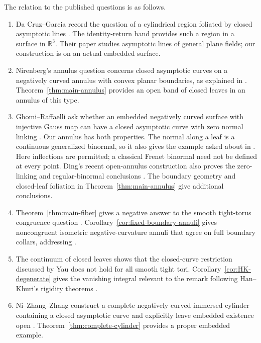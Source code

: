 \documentclass[11pt]{amsart}
\theoremstyle{definition}
\theoremstyle{remark}
\newcommand{\R}{\mathbb R}\newcommand{\Sph}{\mathbb S}
\numberwithin{equation}{section}
\begin{document}
The relation to the published questions is as follows.
\begin{enumerate}[label=\textup{(\roman*)}]
\item Da Cruz--Garcia record the question of a cylindrical region
foliated by closed asymptotic lines \cite[p.~17]{DaCruzGarcia}.
The identity-return band provides such a region in a surface in $\R^3$.
Their paper studies asymptotic lines of general plane fields; our
construction is on an actual embedded surface.
\item Nirenberg's annulus question concerns closed asymptotic curves
on a negatively curved annulus with convex planar boundaries, as
explained in \cite[\S1.2]{GhomiProblems}. Theorem~\ref{thm:main-annulus}
provides an open band of closed leaves in an annulus of this type.
\item Ghomi--Raffaelli ask whether an embedded negatively curved
surface with injective Gauss map can have a closed asymptotic curve
with zero normal linking \cite[Problem~1.1]{GR}. Our annulus has both
properties. The normal along a leaf is a continuous generalized
binormal, so it also gives the example asked about in
\cite[Problem~1.4]{GhomiProblems}. Here inflections are permitted;
a classical Frenet binormal need not be defined at every point.
Ding's recent open-annulus construction also proves the zero-linking
and regular-binormal conclusions \cite[Theorem~1.1 and
Corollary~1.2]{Ding2026}. The boundary geometry and closed-leaf
foliation in Theorem~\ref{thm:main-annulus} give additional conclusions.
\item Theorem~\ref{thm:main-fiber} gives a negative answer to the
smooth tight-torus congruence question \cite[Question~11]{BK}.
Corollary~\ref{cor:fixed-boundary-annuli} gives noncongruent isometric
negative-curvature annuli that agree on full boundary collars,
addressing \cite[Problem~1.3]{GhomiProblems}.
\item The continuum of closed leaves shows that the closed-curve
restriction discussed by Yau \cite[p.~236]{YauReview} does not hold
for all smooth tight tori. Corollary~\ref{cor:HK-degenerate} gives the
vanishing integral relevant to the remark following Han--Khuri's
rigidity theorems \cite[p.~464]{HK}.
\item Ni--Zhang--Zhang construct a complete negatively curved immersed
cylinder containing a closed asymptotic curve and explicitly leave
embedded existence open \cite[Theorem~3.4 and the following paragraph]{NiZhangZhang}.
Theorem~\ref{thm:complete-cylinder} provides a proper embedded example.
\end{enumerate}
\end{document}
